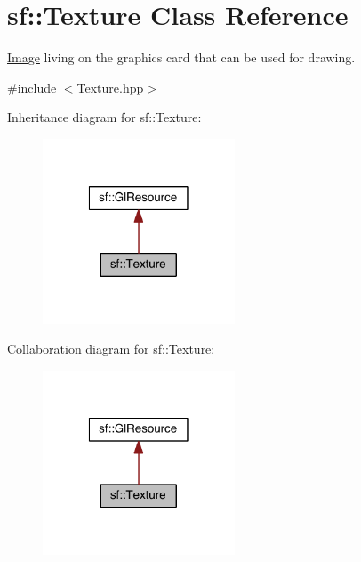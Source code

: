 \hypertarget{classsf_1_1_texture}{\section{sf\-:\-:Texture Class Reference}
\label{classsf_1_1_texture}
}


\hyperlink{classsf_1_1_image}{Image} living on the graphics card that can be used for drawing.  




{\ttfamily \#include $<$Texture.\-hpp$>$}



Inheritance diagram for sf\-:\-:Texture\-:
\nopagebreak
\begin{figure}[H]
\begin{center}
\leavevmode
\includegraphics[width=162pt]{classsf_1_1_texture__inherit__graph}
\end{center}
\end{figure}


Collaboration diagram for sf\-:\-:Texture\-:
\nopagebreak
\begin{figure}[H]
\begin{center}
\leavevmode
\includegraphics[width=162pt]{classsf_1_1_texture__coll__graph}
\end{center}
\end{figure}

